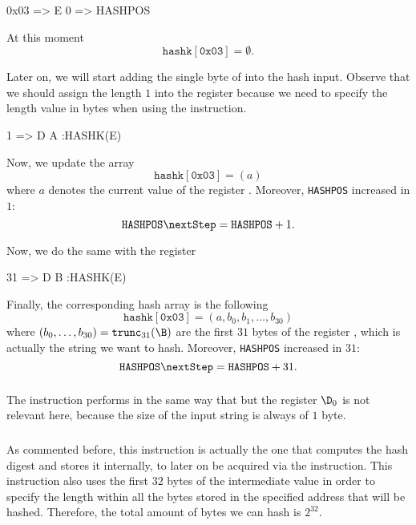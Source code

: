 \begin{zkasm}
    0x03 => E
    0 => HASHPOS
\end{zkasm}

At this moment
\[
\texttt{hashk}[\texttt{0x03}] = \emptyset.
\]

Later on, we will start adding the single byte of \A into the hash input. Observe that we should assign the length $1$ into the register \D because we need to specify the length value in bytes when using the \HASHK instruction. 

\begin{zkasm}
    1 => D
    A				:HASHK(E)
\end{zkasm}

Now, we update the array
\[
\texttt{hashk}[\texttt{0x03}] = (a)
\]
where $a$ denotes the current value of the register \A. Moreover, \texttt{HASHPOS} increased in $1$:
\[
\texttt{HASHPOS} \nextStep = \texttt{HASHPOS} + 1.
\]

Now, we do the same with the register \B

\begin{zkasm}
    31 => D
    B				:HASHK(E)
\end{zkasm}

Finally, the corresponding hash array is the following
\[
\texttt{hashk}[\texttt{0x03}] = (a, b_0, b_1, \dots, b_{30})
\]
where $(b_0, \dots, b_{30}) = \mathtt{trunc}_{31}(\B)$ are the first $31$ bytes of the register \B, which is actually the string we want to hash. Moreover, \texttt{HASHPOS} increased in $31$:
\[
\texttt{HASHPOS} \nextStep = \texttt{HASHPOS} + 31.
\]


\subsubsection{\HASHKONE}

The instruction \HASHKONE performs in the same way that \HASHK but the register $\D_0$ is not relevant here, because the size of the input string is always of $1$ byte. 


\subsubsection{\HASHKLEN}

As commented before, this instruction is actually the one that computes the hash digest and stores it internally, to later on be acquired via the \HASHKDIGEST instruction. This instruction also uses the first $32$ bytes of the \op intermediate value in order to specify the length within all the bytes stored in the specified address that will be hashed. Therefore, the total amount of bytes we can hash is $2^{32}$. 

